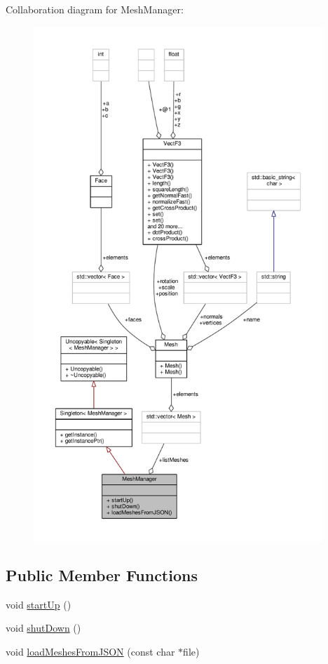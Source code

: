 Collaboration diagram for Mesh\-Manager\-:
\nopagebreak
\begin{figure}[H]
\begin{center}
\leavevmode
\includegraphics[height=550pt]{classMeshManager__coll__graph}
\end{center}
\end{figure}
\subsection*{Public Member Functions}
\begin{DoxyCompactItemize}
\item 
void \hyperlink{classMeshManager_a0ea3bdc14ec06816ece638ebeefd835e}{start\-Up} ()
\item 
void \hyperlink{classMeshManager_a446928112a073f1686349a730a3c2d6a}{shut\-Down} ()
\item 
void \hyperlink{classMeshManager_a1973e4e7ce96fbd5c497bcf5db599f97}{load\-Meshes\-From\-J\-S\-O\-N} (const char $\ast$file)
\end{DoxyCompactItemize}
